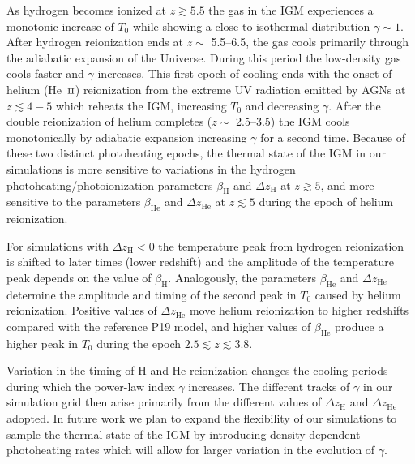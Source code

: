 \documentclass[twocolumn]{aastex62}
\def\HeII{\hbox{He~$\scriptstyle\rm II$}}
\begin{document}
As hydrogen becomes ionized at $z\gtrsim 5.5$ the gas in the IGM experiences a monotonic increase of $T_0$
while showing a close to isothermal distribution $\gamma \sim 1$. After hydrogen reionization ends at $z \sim$ 5.5--6.5, 
the gas cools primarily through the adiabatic expansion of the Universe. During this period the low-density gas cools
faster and $\gamma$ increases. This first epoch of cooling ends with the onset of helium (\HeII) reionization 
from the extreme UV radiation emitted by AGNs at $z \lesssim 4-5$ which reheats the IGM, increasing $T_0$ and decreasing $\gamma$.
After the double reionization of helium completes ($z\sim$ 2.5--3.5) the IGM cools monotonically  
by adiabatic expansion increasing $\gamma$ for a second time. Because of these two distinct photoheating epochs, 
the thermal state of the IGM in our simulations is more sensitive
to variations in the hydrogen photoheating/photoionization parameters 
$\beta_{\mathrm{H}}$ and $\Delta z_{\mathrm{H}}$
at $z\gtrsim 5$, and more sensitive to the parameters 
$\beta_{\mathrm{He}}$ and $\Delta z_{\mathrm{He}}$ at
$z\lesssim 5$ during the epoch of helium reionization.
        


For simulations with $\Delta z_\mathrm{H} <0$ the temperature peak from hydrogen reionization is shifted to later times (lower redshift) 
and the amplitude of the temperature peak depends
on the value of $\beta_\mathrm{H}$. 
Analogously, the parameters $\beta_\mathrm{He} $ and $\Delta z_\mathrm{He}$
determine the amplitude and timing of the second peak in $T_0$ caused by 
helium reionization. Positive values of $\Delta z_\mathrm{He}$ move helium reionization 
to higher redshifts compared with the reference P19 model, and higher values of $\beta_\mathrm{He}$ 
produce a higher peak in $T_0$ during the
epoch $2.5 \lesssim z \lesssim 3.8$.

Variation in the timing of H and He reionization changes the cooling periods during which the power-law index $\gamma$ 
increases.
The different tracks of $\gamma$ in our simulation grid 
then arise primarily from the different values of
$\Delta z_\mathrm{H}$ and $\Delta z_\mathrm{He}$ adopted. In future work we plan to expand the flexibility of our simulations to sample 
the thermal state of the IGM by introducing density dependent photoheating rates which will allow for larger variation in the 
evolution of $\gamma$.
\end{document}
